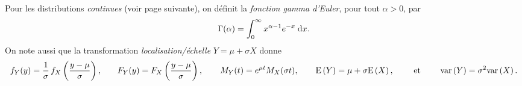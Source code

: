 \documentclass[12pt]{article}
\begin{document}
\begin{landscape}
\medskip
\begin{center}
Pour les distributions \textit{continues} (voir page suivante), on d\'efinit la \textit{fonction gamma d'Euler}, pour tout $\alpha > 0$, par
\begin{equation*}
\Gamma (\alpha ) = \int_{0}^{\infty }x^{\alpha -1}e^{-x}\;{\rm d} x.
\end{equation*}
On note aussi que la transformation \emph{localisation/\'echelle} $Y = \mu +\sigma X$ donne
\begin{equation*}
f_{Y}(y) = {\dfrac{1}{\sigma } \, f_{X}\left( \dfrac{y-\mu }{\sigma }\right) ,%
\qquad }F_{Y}(y)=F_{X}\left( \dfrac{y-\mu }{\sigma }\right),
{\qquad }M_{Y}(t)=e^{\mu t}M_{X}(\sigma t), {\qquad }\text{\rm E}%
\left( Y\right)=\mu +\sigma \text{\rm E} \left( X\right), {\qquad } \mbox{ et } {\qquad }
\text{\rm var}\left( Y\right) =\sigma ^{2}\text{\rm var}\left(X\right).
\end{equation*}
\end{center}

\newpage




\end{landscape}
\end{document}
